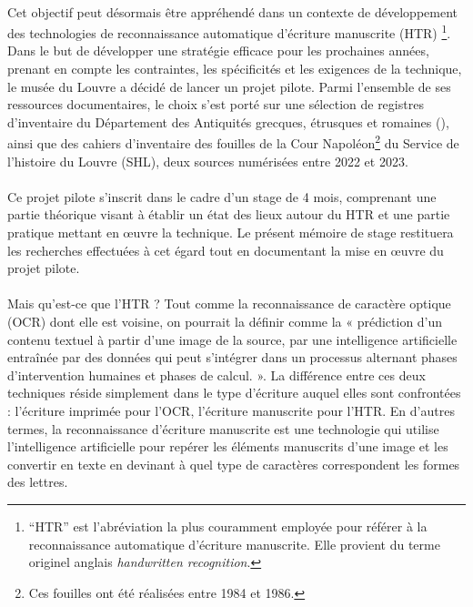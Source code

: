 \documentclass[a4paper,12pt,twoside]{book}
\begin{document}
\paragraph{}
Cet objectif peut désormais être appréhendé dans un contexte de développement des technologies de reconnaissance automatique d’écriture manuscrite (HTR) \footnote{\enquote{HTR} est l’abréviation la plus couramment employée pour référer à la reconnaissance automatique d’écriture manuscrite. Elle provient du terme originel anglais \textit{handwritten recognition}.}. Dans le but de développer une stratégie efficace pour les prochaines années, prenant en compte les contraintes, les spécificités et les exigences de la technique, le musée du Louvre a décidé de lancer un projet pilote. Parmi l'ensemble de ses ressources documentaires, le choix s’est porté sur une sélection de registres d’inventaire du Département des Antiquités grecques, étrusques et romaines (), ainsi que des cahiers d’inventaire des fouilles de la Cour Napoléon\footnote{Ces fouilles ont été réalisées entre 1984 et 1986.} du Service de l’histoire du Louvre (SHL), deux sources numérisées entre 2022 et 2023. 

\paragraph{}
Ce projet pilote s’inscrit dans le cadre d’un stage de 4 mois, comprenant une partie théorique visant à établir un état des lieux autour du HTR et une partie pratique mettant en œuvre la technique. Le présent mémoire de stage restituera les recherches effectuées à cet égard tout en documentant la mise en œuvre du projet pilote.

\paragraph{}
Mais qu’est-ce que l’HTR ? Tout comme la reconnaissance de caractère optique (OCR) dont elle est voisine, on pourrait la définir comme  la « prédiction d’un contenu textuel à partir d’une image de la source, par une intelligence artificielle entraînée par des données qui peut s’intégrer dans un processus alternant phases d’intervention humaines et phases de calcul. ». La différence entre ces deux techniques réside simplement dans le type d’écriture auquel elles sont confrontées : l’écriture imprimée pour l’OCR, l’écriture manuscrite pour l’HTR. En d’autres termes, la reconnaissance d’écriture manuscrite est une technologie qui utilise l'intelligence artificielle pour repérer les éléments manuscrits d’une image et les convertir en texte en devinant à quel type de caractères correspondent les formes des lettres.
\end{document}
